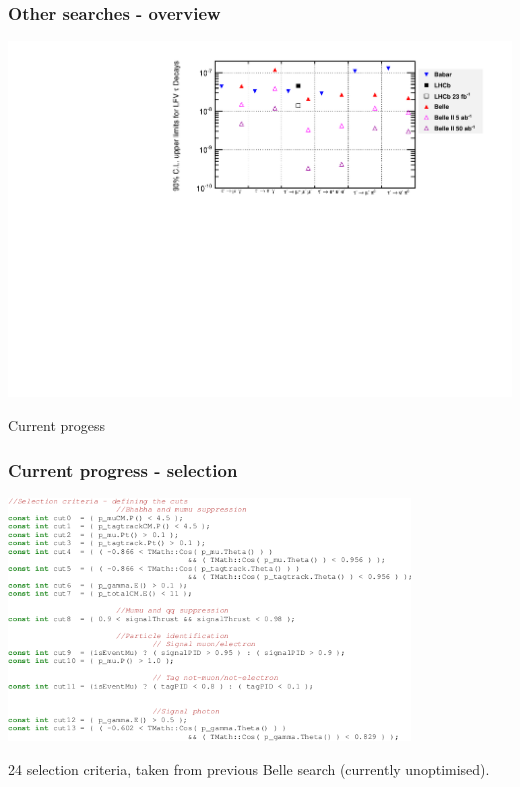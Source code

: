 \documentclass[xcolor=table]{beamer}
\begin{document}
\begin{frame}
\begin{columns}
\end{columns}
\end{frame}



\begin{frame}
\frametitle{Other searches - overview}

\begin{center}
\includegraphics[width=\textwidth]{images/tauLFV.pdf}
\end{center}

\end{frame}



\begin{frame}

\begin{center}
{\Huge Current progess}
\end{center}

\end{frame}


\begin{frame}
\frametitle{Current progress - selection}


\begin{center}
\includegraphics[width=0.8\textwidth]{images/selection-code1.png}
\end{center}

24 selection criteria, taken from previous Belle search (currently unoptimised).


\end{frame}
\end{document}
